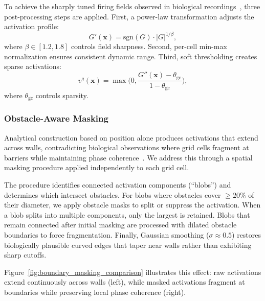 \documentclass[conference]{IEEEtran}
\begin{document}
To achieve the sharply tuned firing fields observed in biological recordings~\cite{hafting2005microstructure}, three post-processing steps are applied. First, a power-law transformation adjusts the activation profile:
\begin{equation}
G'(\mathbf{x}) = \text{sgn}(G) \cdot |G|^{1/\beta},
\label{eq:grid-spread}
\end{equation}
where $\beta \in [1.2, 1.8]$ controls field sharpness. Second, per-cell min-max normalization ensures consistent dynamic range. Third, soft thresholding creates sparse activations:
\begin{equation}
v^g(\mathbf{x}) = \max\Big(0, \frac{G''(\mathbf{x}) - \theta_{\text{gc}}}{1 - \theta_{\text{gc}}}\Big),
\label{eq:grid-threshold}
\end{equation}
where $\theta_{\text{gc}}$ controls sparsity.

\subsubsection{Obstacle-Aware Masking}

Analytical construction based on position alone produces activations that extend across walls, contradicting biological observations where grid cells fragment at barriers while maintaining phase coherence~\cite{derdikman2009fragmentation}. We address this through a spatial masking procedure applied independently to each grid cell.

The procedure identifies connected activation components (``blobs'') and determines which intersect obstacles. For blobs where obstacles cover $\ge 20\%$ of their diameter, we apply obstacle masks to split or suppress the activation. When a blob splits into multiple components, only the largest is retained. Blobs that remain connected after initial masking are processed with dilated obstacle boundaries to force fragmentation. Finally, Gaussian smoothing ($\sigma \approx 0.5$) restores biologically plausible curved edges that taper near walls rather than exhibiting sharp cutoffs.

Figure~\ref{fig:boundary_masking_comparison} illustrates this effect: raw activations extend continuously across walls (left), while masked activations fragment at boundaries while preserving local phase coherence (right).
\end{document}
